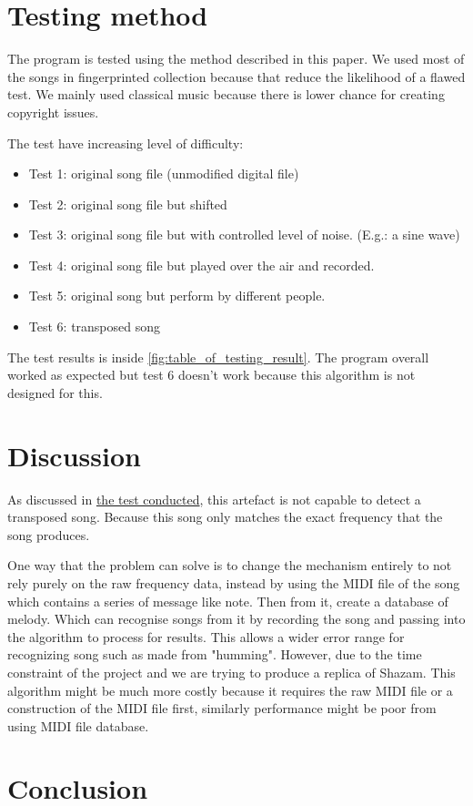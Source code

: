 \cite{wang_systems_2013,macleod_abracadabra_nodate,yang_music_2001}
\chapter{Testing method}
The program is tested using the method described in this paper.\cite{yang_music_2001} We used most of the songs in fingerprinted collection because that reduce the likelihood of a flawed test. We mainly used classical music because there is lower chance for creating copyright issues.

The test have increasing level of difficulty:
\begin{itemize}
    \item Test 1: original song file (unmodified digital file)
    \item Test 2: original song file but shifted 
    \item Test 3: original song file but with controlled level of noise. (E.g.: a sine wave)
    \item Test 4: original song file but played over the air and recorded.
    \item Test 5: original song but perform by different people.
    \item Test 6: transposed song \label{t:test_transposed}
\end{itemize}
The test results is inside \ref{fig:table_of_testing_result}.
The program overall worked as expected but test 6 doesn't work because this algorithm is not designed for this.

\chapter{Discussion}
As discussed in \hyperref[t:test_transposed]{the test conducted}, this artefact is not capable to detect a transposed song. Because this song only matches the exact frequency that the song produces. 

One way that the problem can solve is to change the mechanism entirely to not rely purely on the raw frequency data, instead by using the MIDI file of the song which contains a series of message like note. \cite{amandaghassaei_what_nodate} Then from it, create a database of melody. Which can recognise songs from it by recording the song and passing into the algorithm to process for results. This allows a wider error range for recognizing song such as made from "humming". \cite{ghias_query_1995} However, due to the time constraint of the project and we are trying to produce a replica of Shazam\trademark. This algorithm might be much more costly because it requires the raw MIDI file or a construction of the MIDI file first, similarly performance might be poor from using MIDI file database.\cite{yang_music_2001}
\chapter{Conclusion}

